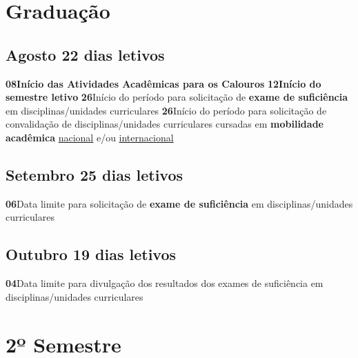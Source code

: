 \documentclass[thesis]{hmcposter}
\begin{document}
\begin{poster}
\section{\color{hmcorange}Graduação}\subsection{Agosto \hfill 22 dias letivos}\textbf{08}\qquad \textbf{Início das Atividades Acadêmicas para os Calouros} \newline \null\textbf{12}\qquad \textbf{Início do semestre letivo} \newline \null\textbf{26}\qquad Início do período para solicitação de \textbf{exame de suficiência} em disciplinas/unidades curriculares \newline \null\textbf{26}\qquad Início do período para solicitação de convalidação de disciplinas/unidades curriculares cursadas em \textbf{mobilidade acadêmica} \underline{nacional} e/ou \underline{internacional} \newline \null\subsection{Setembro \hfill 25 dias letivos}\textbf{06}\qquad Data limite para solicitação de \textbf{exame de suficiência} em disciplinas/unidades curriculares \newline \null\subsection{Outubro \hfill 19 dias letivos}\textbf{04}\qquad Data limite para divulgação dos resultados dos exames de suficiência em disciplinas/unidades curriculares \newline \null\vfill\null
\columnbreak
\section{\hfill \color{hmcorange}2º Semestre}

\end{poster}
\end{document}
